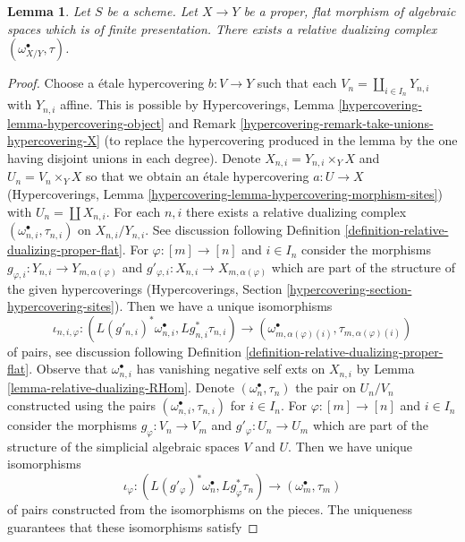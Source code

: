 \documentclass{stacks-project}
\theoremstyle{plain}
\newtheorem{lemma}[subsection]{Lemma}
\theoremstyle{definition}
\theoremstyle{remark}
\numberwithin{equation}{subsection}
\begin{document}
\begin{lemma}
\label{lemma-existence-relative-dualizing}
Let $S$ be a scheme. Let $X \to Y$ be a proper, flat morphism of
algebraic spaces which is of finite presentation.
There exists a relative dualizing complex $(\omega_{X/Y}^\bullet, \tau)$.
\end{lemma}

\begin{proof}
Choose a \'etale hypercovering $b : V \to Y$ such that each
$V_n = \coprod_{i \in I_n} Y_{n, i}$ with $Y_{n, i}$ affine.
This is possible by Hypercoverings, Lemma
\ref{hypercovering-lemma-hypercovering-object} and
Remark \ref{hypercovering-remark-take-unions-hypercovering-X}
(to replace the hypercovering produced
in the lemma by the one having disjoint unions in each degree).
Denote $X_{n, i} = Y_{n, i} \times_Y X$ and $U_n = V_n \times_Y X$
so that we obtain an \'etale hypercovering
$a : U \to X$ (Hypercoverings, Lemma
\ref{hypercovering-lemma-hypercovering-morphism-sites})
with $U_n = \coprod X_{n, i}$.
For each $n, i$ there exists a relative dualizing complex
$(\omega_{n, i}^\bullet, \tau_{n, i})$ on $X_{n, i}/Y_{n, i}$.
See discussion following
Definition \ref{definition-relative-dualizing-proper-flat}.
For $\varphi : [m] \to [n]$ and $i \in I_n$ consider the morphisms
$g_{\varphi, i} : Y_{n, i} \to Y_{m, \alpha(\varphi)}$ and
$g'_{\varphi, i} : X_{n, i} \to X_{m, \alpha(\varphi)}$
which are part of the structure of the given hypercoverings
(Hypercoverings, Section \ref{hypercovering-section-hypercovering-sites}).
Then we have a unique isomorphisms
$$
\iota_{n, i, \varphi} :
(L(g'_{n, i})^*\omega_{n, i}^\bullet, Lg_{n, i}^*\tau_{n, i})
\longrightarrow
(\omega_{m, \alpha(\varphi)(i)}^\bullet, \tau_{m, \alpha(\varphi)(i)})
$$
of pairs, see discussion following
Definition \ref{definition-relative-dualizing-proper-flat}.
Observe that $\omega_{n, i}^\bullet$ has vanishing negative
self exts on $X_{n, i}$ by Lemma \ref{lemma-relative-dualizing-RHom}.
Denote $(\omega_n^\bullet, \tau_n)$ the pair on $U_n/V_n$ constructed using
the pairs $(\omega_{n, i}^\bullet, \tau_{n, i})$ for $i \in I_n$.
For $\varphi : [m] \to [n]$ and $i \in I_n$ consider the morphisms
$g_\varphi : V_n \to V_m$ and $g'_\varphi : U_n \to U_m$ which are part
of the structure of the simplicial algebraic spaces $V$ and $U$.
Then we have unique isomorphisms
$$
\iota_\varphi :
(L(g'_\varphi)^*\omega_n^\bullet, Lg_\varphi^*\tau_n)
\longrightarrow
(\omega_m^\bullet, \tau_m)
$$
of pairs constructed from the isomorphisms on the pieces.
The uniqueness guarantees that these isomorphisms satisfy

\end{proof}
\end{document}
